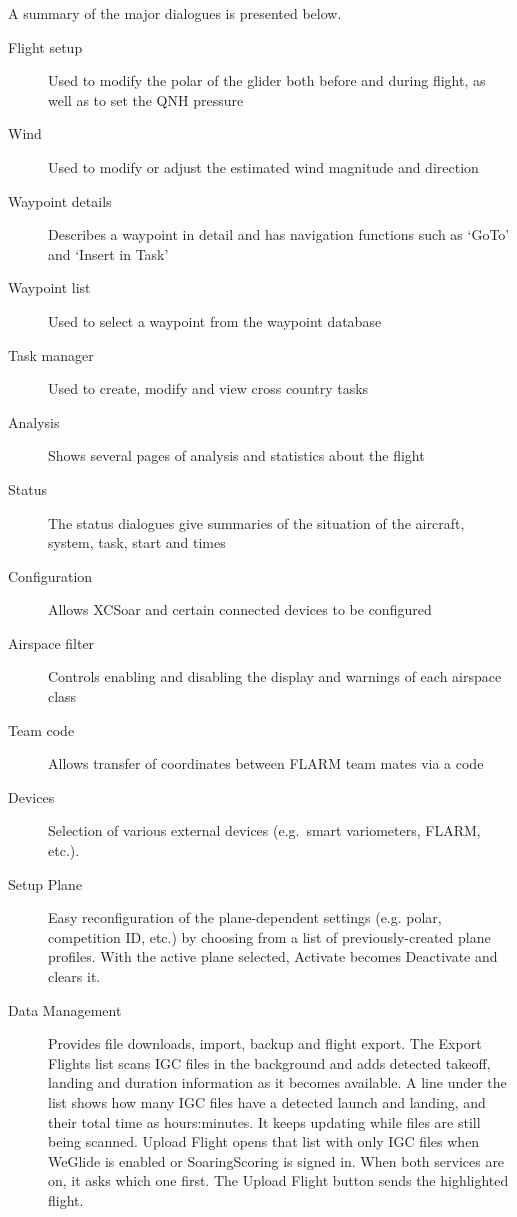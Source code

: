 A summary of the major dialogues is presented below.
\begin{description}
\item[Flight setup] Used to modify the polar of the glider both before and
during flight, as well as to set the QNH pressure
\item[Wind] Used to modify or adjust the estimated wind magnitude and direction
\item[Waypoint details] Describes a waypoint in detail and has navigation
functions such as `GoTo' and `Insert in Task'
\item[Waypoint list] Used to select a waypoint from the waypoint database
\item[Task manager] Used to create, modify and view cross country tasks
\item[Analysis] Shows several pages of analysis and statistics about the flight
\item[Status] The status dialogues give summaries of the situation of the 
aircraft, system, task, start and times
\item[Configuration] Allows XCSoar and certain connected devices to be
configured
\item[Airspace filter] Controls enabling and disabling the display and warnings
of each airspace class
\item[Team code] Allows transfer of coordinates between FLARM team mates via a 
  code
\item[Devices]  Selection of various external devices (e.g.\ smart variometers,
  FLARM, etc.).
\item[Setup Plane]  Easy reconfiguration of the plane-dependent settings (e.g. 
  polar, competition ID, etc.) by choosing from a list of previously-created 
  plane profiles.  With the active plane selected, Activate becomes
  Deactivate and clears it.
\item[Data Management] Provides file downloads, import, backup and flight
  export.  The Export Flights list scans IGC files in the background and adds
  detected takeoff, landing and duration information as it becomes available.
  A line under the list shows how many IGC files have a detected launch and
  landing, and their total time as hours:minutes. It keeps updating while
  files are still being scanned.
  Upload Flight opens that list with only IGC files when WeGlide is
  enabled or SoaringScoring is signed in. When both services are on,
  it asks which one first. The Upload Flight button sends the
  highlighted flight.
\end{description}

